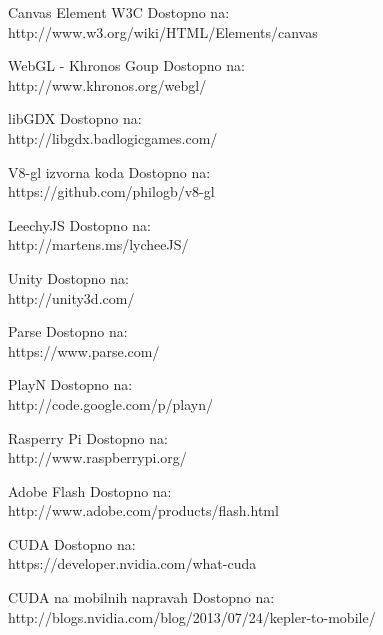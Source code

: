 \begin{thebibliography}{1}

 Canvas Element W3C 
Dostopno na:\\ http://www.w3.org/wiki/HTML/Elements/canvas

 WebGL - Khronos Goup 
Dostopno na:\\ http://www.khronos.org/webgl/

 libGDX 
Dostopno na:\\ http://libgdx.badlogicgames.com/

 V8-gl izvorna koda 
Dostopno na:\\ https://github.com/philogb/v8-gl

 LeechyJS 
Dostopno na:\\ http://martens.ms/lycheeJS/

 Unity 
Dostopno na:\\ http://unity3d.com/

 Parse 
Dostopno na:\\ https://www.parse.com/

 PlayN 
Dostopno na:\\ http://code.google.com/p/playn/

 Rasperry Pi 
Dostopno na:\\ http://www.raspberrypi.org/

 Adobe Flash
Dostopno na:\\ http://www.adobe.com/products/flash.html


 CUDA
Dostopno na:\\ https://developer.nvidia.com/what-cuda

 CUDA na mobilnih napravah
Dostopno na:\\ http://blogs.nvidia.com/blog/2013/07/24/kepler-to-mobile/


\end{thebibliography}


